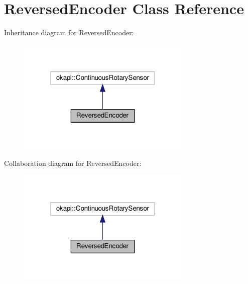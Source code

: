\hypertarget{classReversedEncoder}{}\section{Reversed\+Encoder Class Reference}
\label{classReversedEncoder}


Inheritance diagram for Reversed\+Encoder\+:\nopagebreak
\begin{figure}[H]
\begin{center}
\leavevmode
\includegraphics[width=235pt]{classReversedEncoder__inherit__graph}
\end{center}
\end{figure}


Collaboration diagram for Reversed\+Encoder\+:\nopagebreak
\begin{figure}[H]
\begin{center}
\leavevmode
\includegraphics[width=235pt]{classReversedEncoder__coll__graph}
\end{center}
\end{figure}

